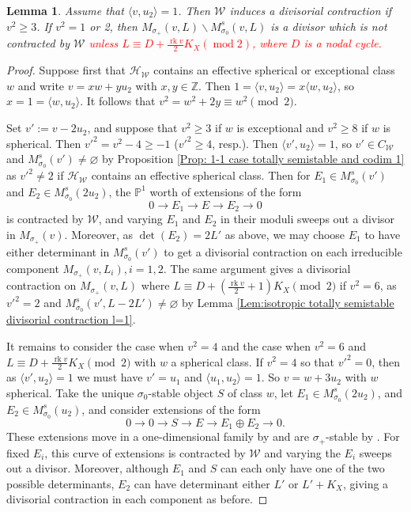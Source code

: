 \documentclass[leqno,11pt]{amsart}
\def\P{\ensuremath{\mathbb{P}}}
\def\Z{\ensuremath{\mathbb{Z}}}
\def\mod{\mathop{\mathrm{mod}}\nolimits}
\def\rk{\mathop{\mathrm{rk}}}
\newtheorem{Lem}[Thm]{Lemma}
\theoremstyle{definition}
\def\P{\ensuremath{\mathbb{P}}}
\def\Z{\ensuremath{\mathbb{Z}}}
\def\HH{\ensuremath{\mathcal H}}
\def\WW{\ensuremath{\mathcal W}}
\begin{document}
\begin{Lem}\label{Lem:isotropic divisorial l=1 1}
Assume that $\langle v,u_2\rangle=1$.  Then $\WW$ induces a divisorial contraction if $v^2\geq 3$.  If $v^2=1$ or 2, then $M_{\sigma_+}(v,L)\backslash M^s_{\sigma_0}(v,L)$ is a divisor which is not contracted by $\WW$ \textcolor{red}{unless $L \equiv D+\frac{\rk v}{2}K_X (\mod 2)$,
where $D$ is a nodal cycle.}
\end{Lem}
\begin{proof}
Suppose first that $\HH_{\WW}$ contains an effective spherical or exceptional class $w$ and write $v=xw+yu_2$ with $x,y\in\Z$.  Then $1=\langle v,u_2\rangle=x\langle w,u_2\rangle$, so $x=1=\langle w,u_2\rangle$.  It follows that $v^2=w^2+2y\equiv w^2\pmod 2$.  

Set $v':=v-2u_2$, and suppose that $v^2\geq 3$ if $w$ is exceptional and $v^2\geq 8$ if $w$ is spherical.  Then $v'^2=v^2-4\geq-1$ ($v'^2\geq 4$, resp.).  Then $\langle v',u_2\rangle=1$, so $v'\in C_{\WW}$ and $M^s_{\sigma_0}(v')\neq\varnothing$ by Proposition \ref{Prop: 1-1 case totally semistable and codim 1} as $v'^2\neq 2$ if $\HH_{\WW}$ contains an effective spherical class.  Then for $E_1\in M^s_{\sigma_0}(v')$ and $E_2\in M^s_{\sigma_0}(2u_2)$, the $\P^1$ worth of extensions of the form $$0\to E_1\to E\to E_2\to 0$$ is contracted by $\WW$, and varying $E_1$ and $E_2$ in their moduli sweeps out a divisor in $M_{\sigma_+}(v)$.  Moreover, as $\det(E_2)=2L'$ as above, we may choose $E_1$ to have either determinant in $M_{\sigma_0}^s(v')$ to get a divisorial contraction on each irreducible component $M_{\sigma_+}(v,L_i),i=1,2$.  The same argument gives a divisorial contraction on $M_{\sigma_+}(v,L)$ where $L\equiv D+(\frac{\rk v}{2}+1)K_X\pmod 2$ if $v^2=6$, as $v'^2=2$ and $M_{\sigma_0}^s(v',L-2L')\neq\varnothing$ by Lemma \ref{Lem:isotropic totally semistable divisorial contraction l=1}.

It remains to consider the case when $v^2=4$ and the case when $v^2=6$ and $L\equiv D+\frac{\rk v}{2}K_X\pmod 2$  with $w$ a spherical class.  If $v^2=4$ so that $v'^2=0$, then as $\langle v',u_2\rangle=1$ we must have $v'=u_1$ and $\langle u_1,u_2\rangle=1$.  So $v=w+3u_2$ with $w$ spherical.  Take the unique $\sigma_0$-stable object $S$ of class $w$, let $E_1\in M^s_{\sigma_0}(2u_2)$, and $E_2\in M^s_{\sigma_0}(u_2)$, and consider extensions of the form $$0\to 0\to S\to E\to E_1\oplus E_2\to 0.$$  These extensions move in a one-dimensional family by \cite[Lemma 6.3]{CH15} and are $\sigma_+$-stable by \cite[Lemma 6.1]{CH15}.  For fixed $E_i$, this curve of extensions is contracted by $\WW$ and varying the $E_i$ sweeps out a divisor.  Moreover, although $E_1$ and $S$ can each only have one of the two possible determinants, $E_2$ can have determinant either $L'$ or $L'+K_X$, giving a divisorial contraction in each component as before.


\end{proof}
\end{document}
